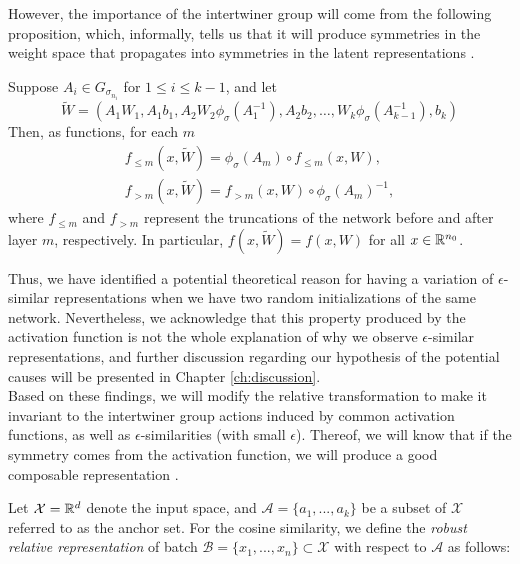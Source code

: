 \documentclass[../main.tex]{subfiles}
\begin{document}
However, the importance of the intertwiner group will come from the following proposition, which, informally, tells us that it will produce symmetries in the weight space that propagates into symmetries in the latent representations \cite{godfrey_symmetries_2023}.

\begin{proposition}
  \label{lem:comm-w-sig}
  Suppose $A_i \in G_{\sigma_{n_i}}$ for $1 \leq i \leq k-1$, and let 
  \begin{equation*}
  \widetilde{W}  = (A_1 W_1, A_1b_1, A_2 W_2 \phi_{\sigma}(A_1^{-1}), A_2 b_2 , \dots,
  W_{k}\phi_{\sigma}(A_{k-1}^{-1}), b_{k})
  \end{equation*}
  Then, as functions, for each $m$
  \begin{gather*}
       f_{\leq m}(x, \widetilde{W} ) = \phi_\sigma(A_m) \circ f_{\leq m}(x, W),\\
       f_{> m}(x, \widetilde{W} ) = f_{>m}(x, W) \circ \phi_{\sigma}(A_m)^{-1},
  \end{gather*}
  where $f_{\leq m}$ and $f_{> m}$ represent the truncations of the network before and after layer $m$, respectively. In particular, $f(x, \widetilde{W} ) = f(x, W)$ for all $x \in \mathbb{R}^{n_0}$.
\end{proposition}

Thus, we have identified a potential theoretical reason for having a variation of $\epsilon$-similar representations when we have two random initializations of the same network. Nevertheless, we acknowledge that this property produced by the activation function is not the whole explanation of why we observe $\epsilon$-similar representations, and further discussion regarding our hypothesis of the potential causes will be presented in Chapter \ref{ch:discussion}.\\

Based on these findings, we will modify the relative transformation to make it invariant to the intertwiner group actions induced by common activation functions, as well as $\epsilon$-similarities (with small $\epsilon$). Thereof, we will know that if the symmetry comes from the activation function, we will produce a good composable representation \cite[Theorem 4.2]{godfrey_symmetries_2023}.

Let $\mathcal{X}=\mathbb{R}^d$ denote the input space, and $\mathcal{A}= \{a_1, ..., a_k\}$ be a subset of $\mathcal{X}$ referred to as the anchor set. For the cosine similarity, we define the \emph{robust relative representation} of batch $\mathcal{B} = \{x_1, ..., x_n\}\subset \mathcal{X}$ with respect to $\mathcal{A}$ as follows:
\end{document}
